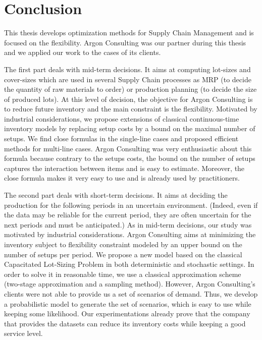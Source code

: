 \chapter*{Conclusion}
\label{chap:conclusion}


This thesis develops optimization methods for Supply Chain Management and is focused on the flexibility.
Argon Consulting was our partner during this thesis and we applied our work to the cases of its clients.


The first part deals with mid-term decisions.
It aims at computing lot-sizes and cover-sizes which are used in several Supply Chain processes as MRP (to decide the quantity of raw materials to order) or production planning (to decide the size of produced lots).
At this level of decision, the objective for Argon Consulting is to reduce future inventory and the main constraint is the flexibility.
Motivated by industrial considerations, we propose extensions of classical continuous-time inventory models by replacing setup costs by a bound on the maximal number of setups.
We find close formulas in the single-line cases and proposed efficient methods for multi-line cases.
Argon Consulting was very enthusiastic about this formula because contrary to the setups costs, the bound on the number of setups captures the interaction between items and is easy to estimate.
Moreover, the close formula makes it very easy to use and is already used by practitioners.


The second part deals with short-term decisions.
It aims at deciding the production for the following periods in an uncertain environment.
(Indeed, even if the data may be reliable for the current period, they are often uncertain for the next periods and must be anticipated.)
As in mid-term decisions, our study was motivated by industrial considerations.
Argon Consulting aims at minimizing the inventory subject to flexibility constraint modeled by an upper bound on the number of setups per period.
We propose a new model based on the classical Capacitated Lot-Sizing Problem in both deterministic and stochastic settings.
In order to solve it in reasonable time, we use a classical approximation scheme (two-stage approximation and a sampling method).
However, Argon Consulting's clients were not able to provide us a set of scenarios of demand.
Thus, we develop a probabilistic model to generate the set of scenarios, which is easy to use while keeping some likelihood.
Our experimentations already prove that the company that provides the datasets can reduce its inventory costs while keeping a good service level.



